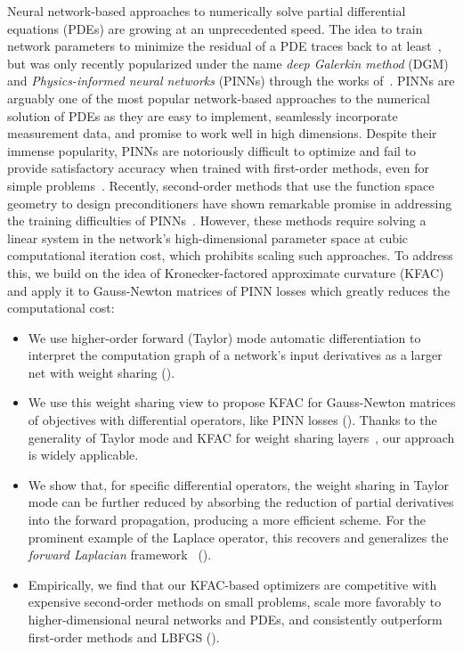 Neural network-based approaches to numerically solve partial differential equations (PDEs) are growing at an unprecedented speed.
The idea to train network parameters to minimize the residual of a PDE traces back to at least~\citet{dissanayake1994neural, lagaris1998artificial}, but was only recently popularized under the name \emph{deep Galerkin method} (DGM) and \emph{Physics-informed neural networks} (PINNs) through the works of~\citet{sirignano2018dgm, raissi2019physics}.
PINNs are arguably one of the most popular network-based approaches to the numerical solution of PDEs as they are easy to implement, seamlessly incorporate measurement data, and promise to work well in high dimensions.
Despite their immense popularity, PINNs are notoriously difficult to optimize \citep{wang2021understanding} and fail to provide satisfactory accuracy when trained with first-order methods, even for simple problems~\citep{zeng2022competitive, muller2023achieving}.
Recently, second-order methods that use the function space geometry to design preconditioners have shown remarkable promise in addressing the training difficulties of PINNs~\citep{zeng2022competitive, muller2023achieving, de2023operator,jnini2024gauss, muller2024optimization}.
However, these methods require solving a linear system in the network's high-dimensional parameter space at cubic computational iteration cost, which prohibits scaling such approaches.
To address this, we build on the idea of Kronecker-factored approximate curvature (KFAC) and apply it to Gauss-Newton matrices of PINN losses which greatly reduces the computational cost:
\begin{itemize}
\item We use higher-order forward (Taylor) mode automatic differentiation to interpret the computation graph of a network's input derivatives as a larger net with weight sharing ().

\item We use this weight sharing view to propose KFAC for Gauss-Newton matrices of objectives with differential operators, like PINN losses ().
  Thanks to the generality of Taylor mode and KFAC for weight sharing layers~\cite{eschenhagen2023kroneckerfactored}, our approach is widely applicable.

\item We show that, for specific differential operators, the weight sharing in Taylor mode can be further reduced by absorbing the reduction of partial derivatives into the forward propagation, producing a more efficient scheme.
  For the prominent example of the Laplace operator, this recovers and generalizes the \emph{forward Laplacian} framework~\cite{li2023forward} ().

\item Empirically, we find that our KFAC-based optimizers are competitive with expensive second-order methods on small problems, scale more favorably to higher-dimensional neural networks and PDEs, and consistently outperform first-order methods and LBFGS ().
\end{itemize}

